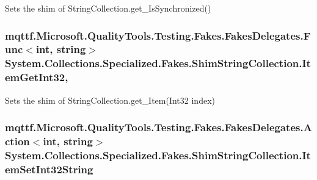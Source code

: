 Sets the shim of String\-Collection.\-get\-\_\-\-Is\-Synchronized()

\hypertarget{class_system_1_1_collections_1_1_specialized_1_1_fakes_1_1_shim_string_collection_afe4b2a8674ba6c6ec5c0d57cf8c3bb17}{
\subsubsection[{Item\-Get\-Int32}]{\setlength{\rightskip}{0pt plus 5cm}mqttf.\-Microsoft.\-Quality\-Tools.\-Testing.\-Fakes.\-Fakes\-Delegates.\-Func$<$int, string$>$ System.\-Collections.\-Specialized.\-Fakes.\-Shim\-String\-Collection.\-Item\-Get\-Int32\hspace{0.3cm}{\ttfamily [get]}, {\ttfamily [set]}}}\label{class_system_1_1_collections_1_1_specialized_1_1_fakes_1_1_shim_string_collection_afe4b2a8674ba6c6ec5c0d57cf8c3bb17}


Sets the shim of String\-Collection.\-get\-\_\-\-Item(\-Int32 index)

\hypertarget{class_system_1_1_collections_1_1_specialized_1_1_fakes_1_1_shim_string_collection_a9482c7b44d42765ad584cbf60303202e}{
\subsubsection[{Item\-Set\-Int32\-String}]{\setlength{\rightskip}{0pt plus 5cm}mqttf.\-Microsoft.\-Quality\-Tools.\-Testing.\-Fakes.\-Fakes\-Delegates.\-Action$<$int, string$>$ System.\-Collections.\-Specialized.\-Fakes.\-Shim\-String\-Collection.\-Item\-Set\-Int32\-String\hspace{0.3cm}{\ttfamily [set]}}}\label{class_system_1_1_collections_1_1_specialized_1_1_fakes_1_1_shim_string_collection_a9482c7b44d42765ad584cbf60303202e}


